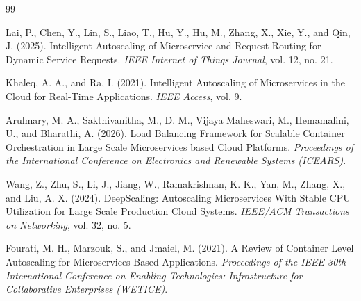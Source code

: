 \clearpage
{}
{}


\begin{thebibliography}{99}
\vspace{-5.5em}

Lai, P., Chen, Y., Lin, S., Liao, T., Hu, Y., Hu, M., Zhang, X., Xie, Y., and Qin, J. (2025). 
Intelligent Autoscaling of Microservice and Request Routing for Dynamic Service Requests. 
\textit{IEEE Internet of Things Journal}, vol. 12, no. 21.

Khaleq, A. A., and Ra, I. (2021). 
Intelligent Autoscaling of Microservices in the Cloud for Real-Time Applications. 
\textit{IEEE Access}, vol. 9.

Arulmary, M. A., Sakthivanitha, M., D. M., Vijaya Maheswari, M., Hemamalini, U., and Bharathi, A. (2026). 
Load Balancing Framework for Scalable Container Orchestration in Large Scale Microservices based Cloud Platforms. 
\textit{Proceedings of the International Conference on Electronics and Renewable Systems (ICEARS)}.

Wang, Z., Zhu, S., Li, J., Jiang, W., Ramakrishnan, K. K., Yan, M., Zhang, X., and Liu, A. X. (2024). 
DeepScaling: Autoscaling Microservices With Stable CPU Utilization for Large Scale Production Cloud Systems. 
\textit{IEEE/ACM Transactions on Networking}, vol. 32, no. 5.

Fourati, M. H., Marzouk, S., and Jmaiel, M. (2021). 
A Review of Container Level Autoscaling for Microservices-Based Applications. 
\textit{Proceedings of the IEEE 30th International Conference on Enabling Technologies: Infrastructure for Collaborative Enterprises (WETICE)}.

\end{thebibliography}
